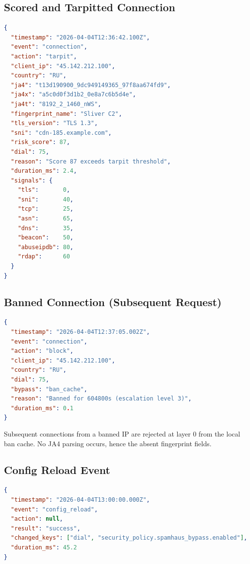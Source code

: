 \subsection{Scored and Tarpitted Connection}

\begin{lstlisting}[language=json]
{
  "timestamp": "2026-04-04T12:36:42.100Z",
  "event": "connection",
  "action": "tarpit",
  "client_ip": "45.142.212.100",
  "country": "RU",
  "ja4": "t13d190900_9dc949149365_97f8aa674fd9",
  "ja4x": "a5c0d0f3d1b2_0e8a7c6b5d4e",
  "ja4t": "8192_2_1460_nWS",
  "fingerprint_name": "Sliver C2",
  "tls_version": "TLS 1.3",
  "sni": "cdn-185.example.com",
  "risk_score": 87,
  "dial": 75,
  "reason": "Score 87 exceeds tarpit threshold",
  "duration_ms": 2.4,
  "signals": {
    "tls":       0,
    "sni":       40,
    "tcp":       25,
    "asn":       65,
    "dns":       35,
    "beacon":    50,
    "abuseipdb": 80,
    "rdap":      60
  }
}
\end{lstlisting}

\subsection{Banned Connection (Subsequent Request)}

\begin{lstlisting}[language=json]
{
  "timestamp": "2026-04-04T12:37:05.002Z",
  "event": "connection",
  "action": "block",
  "client_ip": "45.142.212.100",
  "country": "RU",
  "dial": 75,
  "bypass": "ban_cache",
  "reason": "Banned for 604800s (escalation level 3)",
  "duration_ms": 0.1
}
\end{lstlisting}

Subsequent connections from a banned IP are rejected at layer 0 from the local ban
cache. No JA4 parsing occurs, hence the absent fingerprint fields.

\subsection{Config Reload Event}

\begin{lstlisting}[language=json]
{
  "timestamp": "2026-04-04T13:00:00.000Z",
  "event": "config_reload",
  "action": null,
  "result": "success",
  "changed_keys": ["dial", "security_policy.spamhaus_bypass.enabled"],
  "duration_ms": 45.2
}
\end{lstlisting}

